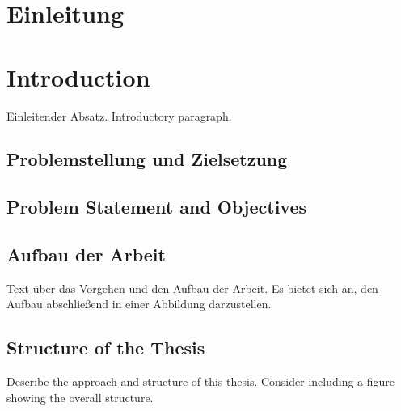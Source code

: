 \ifnum{}
  \chapter{Einleitung}
\else
  \chapter{Introduction}
\fi
\label{ch:einleitung}

\ifnum{}
  Einleitender Absatz.
\else
  Introductory paragraph.
\fi

\ifnum{}
  \section{Problemstellung und Zielsetzung}
\else
  \section{Problem Statement and Objectives}
\fi

\ifnum{}
  \section{Aufbau der Arbeit}
  Text über das Vorgehen und den Aufbau der Arbeit.
  Es bietet sich an, den Aufbau abschließend in einer Abbildung darzustellen.
\else
  \section{Structure of the Thesis}
  Describe the approach and structure of this thesis.
  Consider including a figure showing the overall structure.
\fi
